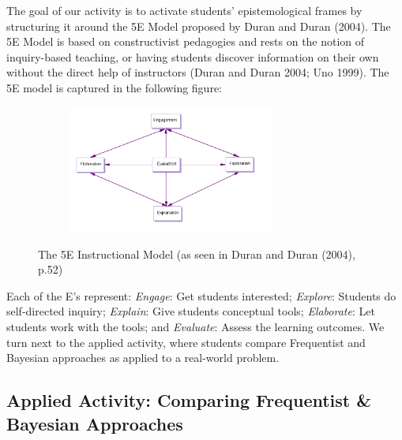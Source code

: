 \documentclass[
  12pt,
  letterpaper,
  DIV=11,
  numbers=noendperiod]{scrartcl}
\begin{document}
The goal of our activity is to activate students' epistemological frames
by structuring it around the 5E Model proposed by Duran and Duran
(2004). The 5E Model is based on constructivist pedagogies and rests on
the notion of inquiry-based teaching, or having students discover
information on their own without the direct help of instructors (Duran
and Duran 2004; Uno 1999). The 5E model is captured in the following
figure:

\begin{figure}

{\centering 

\begin{figure}[H]

{\centering \includegraphics[width=0.75\textwidth,height=\textheight]{01-mpsa-5E.png}

}

\end{figure}

}

\caption{\label{fig-5E}The 5E Instructional Model (as seen in Duran and
Duran (2004), p.52)}

\end{figure}

Each of the E's represent: \emph{Engage}: Get students interested;
\emph{Explore}: Students do self-directed inquiry; \emph{Explain}: Give
students conceptual tools; \emph{Elaborate}: Let students work with the
tools; and \emph{Evaluate}: Assess the learning outcomes. We turn next
to the applied activity, where students compare Frequentist and Bayesian
approaches as applied to a real-world problem.

\hypertarget{sec-applied-activity}{%
\subsection{Applied Activity: Comparing Frequentist \& Bayesian
Approaches}\label{sec-applied-activity}}
\end{document}
